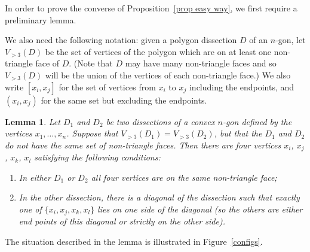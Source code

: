 \documentclass[11pt]{article}
\newtheorem{lem}[thm]{Lemma}
\theoremstyle{remark}
\theoremstyle{definition}
\begin{document}
In order to prove the converse of Proposition~\ref{prop easy way}, we first require a preliminary lemma.

We also need the following notation: given a polygon dissection $D$ of an $n$-gon, let $V_{>3}(D)$ be the set of vertices of the polygon which are on at least one non-triangle face of $D$.  (Note that $D$ may have many non-triangle faces and so $V_{>3}(D)$ will be the union of the vertices of each non-triangle face.) We also write $[x_i,x_j]$ for the set of vertices from $x_i$ to $x_j$ including the endpoints, and $(x_i,x_j)$ for the same set but excluding the endpoints.

\begin{lem}\label{lem good quads}
Let $D_1$ and $D_2$ be two dissections of a convex $n$-gon defined by the vertices $x_1, \ldots, x_n$.  Suppose that $V_{>3}(D_1) = V_{>3}(D_2)$, but that the $D_1$ and $D_2$ do not have the same set of non-triangle faces.  Then there are four vertices $x_i$, $x_j$, $x_k$, $x_l$ satisfying the following conditions:\begin{enumerate} \item In either $D_1$ or $D_2$ all four vertices are on the same non-triangle face; \item In the other dissection, there is a diagonal of the dissection such that exactly one of $\{x_i, x_j, x_k, x_l\}$ lies on one side of the diagonal (so the others are either end points of this diagonal or strictly on the other side). \end{enumerate}
\end{lem} 

The situation described in the lemma is illustrated in Figure~\ref{configs}.
\end{document}

